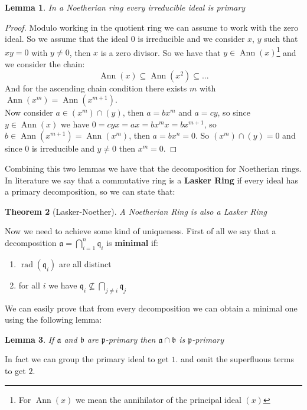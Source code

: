 \documentclass[notitlepage, a4]{book}
\theoremstyle{plain}
\newtheorem{teo}{Theorem}[section]
\newtheorem{lem}[teo]{Lemma}
\theoremstyle{remark}
\theoremstyle{definition}
\newcommand{\p}{\mathfrak{p}}
\newcommand{\q}{\mathfrak{q}}
\newcommand{\A}{\mathfrak{a}}
\newcommand{\B}{\mathfrak{b}}
\DeclareMathOperator{\rad}{rad}
\DeclareMathOperator{\Ann}{Ann}
\newcounter{que}
\begin{document}
\begin{lem}
	In a Noetherian ring every irreducible ideal is primary
\end{lem}

\begin{proof}
Modulo working in the quotient ring we can assume to work with the zero ideal. So we assume that the ideal $ 0 $ is irreducible and we consider $ x$, $y $ such that $ xy = 0 $ with $ y\neq 0 $, then $ x $ is a zero divisor. So we have that $ y \in \Ann(x) $\footnote{For $ \Ann(x) $ we mean the annihilator of the principal ideal $ (x) $} and we consider the chain:
$$ \Ann(x)  \subseteq \Ann(x^2) \subseteq ...$$
And for the ascending chain condition there exists $ m $ with $ \Ann(x^m)= \Ann(x^{m+1})$. \\
Now consider $ a \in (x^m)\cap (y) $, then $ a = bx^m $ and $ a = cy $, so since $ y \in \Ann(x) $ we have $ 0 = cyx = ax = bx^m x=  bx^{m+1}$, so $ b \in  \Ann(x^{m+1}) = \Ann(x^m) $, then $ a = bx^n = 0 $. So $ (x^m)\cap (y)=0 $ and since $ 0 $ is irreducible and $ y\neq 0 $ then $ x^m=0 $. 
\end{proof}

Combining this two lemmas we have that the decomposition for Noetherian rings. In literature we say that a commutative ring is a \textbf{Lasker Ring} if every ideal has a primary decomposition, so we can state that:

\begin{teo}[Lasker-Noether]
A Noetherian Ring is also a Lasker Ring
\end{teo}
Now we need to achieve some kind of uniqueness. First of all we say that a decomposition $ \A = \bigcap_{i=1}^n \q_i $ is \textbf{minimal} if:
\begin{enumerate}
\item $ \rad(\q_i) $ are all distinct
\item for all $ i $ we have $ \q_i \not \subseteq \bigcap_{j\neq i} \q_j $
\end{enumerate}

We can easily prove that from every decomposition we can obtain a minimal one using the following lemma:

\begin{lem}
If $ \A $ and $ \B $ are $ \p $-primary then $ \A \cap \B $ is $ \p $-primary
\end{lem}

In fact we can group the primary ideal to get $ 1. $ and omit the superfluous terms to get $ 2. $
\end{document}

